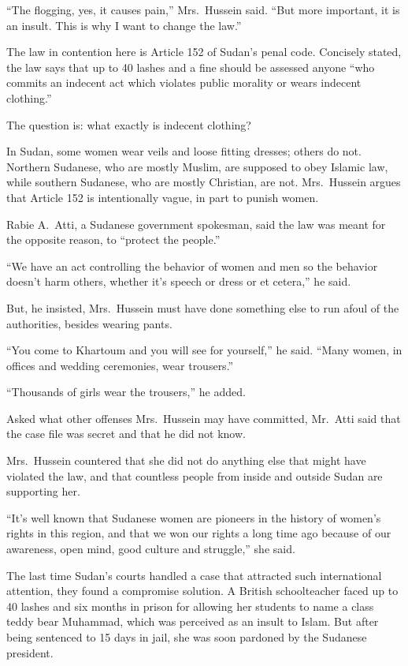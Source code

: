 ﻿\documentclass[12pt]{article}
\begin{document}
``The flogging, yes, it causes pain,'' Mrs.~Hussein said. ``But more important, it is an insult.
This is why I want to change the law.''

The law in contention here is Article 152 of Sudan's penal code. Concisely stated, the law says that
up to 40 lashes and a fine should be assessed anyone ``who commits an indecent act which violates
public morality or wears indecent clothing.''

The question is: what exactly is indecent clothing?

In Sudan, some women wear veils and loose fitting dresses; others do not. Northern Sudanese, who are
mostly Muslim, are supposed to obey Islamic law, while southern Sudanese, who are mostly Christian,
are not. Mrs.~Hussein argues that Article 152 is intentionally vague, in part to punish women.

Rabie A.~Atti, a Sudanese government spokesman, said the law was meant for the opposite reason, to
``protect the people.''

``We have an act controlling the behavior of women and men so the behavior doesn't harm others,
whether it's speech or dress or et cetera,'' he said.

But, he insisted, Mrs.~Hussein must have done something else to run afoul of the authorities,
besides wearing pants.

``You come to Khartoum and you will see for yourself,'' he said. ``Many women, in offices and
wedding ceremonies, wear trousers.''

``Thousands of girls wear the trousers,'' he added.

Asked what other offenses Mrs.~Hussein may have committed, Mr.~Atti said that the case file was
secret and that he did not know.

Mrs.~Hussein countered that she did not do anything else that might have violated the law, and that
countless people from inside and outside Sudan are supporting her.

``It's well known that Sudanese women are pioneers in the history of women's rights in this region,
and that we won our rights a long time ago because of our awareness, open mind, good culture and
struggle,'' she said.

The last time Sudan's courts handled a case that attracted such international attention, they found
a compromise solution. A British schoolteacher faced up to 40 lashes and six months in prison for
allowing her students to name a class teddy bear Muhammad, which was perceived as an insult to
Islam. But after being sentenced to 15 days in jail, she was soon pardoned by the Sudanese
president.
\end{document}
